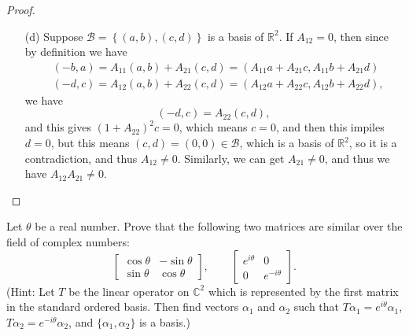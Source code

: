 \begin{proof}
\begin{itemize}
        \item [(d)] Suppose \(\mathcal{B} = \left\{ (a, b), (c, d) \right\} \) is a basis of \(\mathbb{R} ^2\). If \(A_{12} = 0\), then since by definition we have 
        \begin{align*}
            &(-b, a) = A_{11} (a, b) + A_{21} (c, d) = \left( A_{11} a + A_{21}c, A_{11}b + A_{21}d  \right)  \\
            &(-d, c) = A_{12} (a, b) + A_{22} (c, d) = \left( A_{12}a + A_{22}c, A_{12}b + A_{22}d     \right),
        \end{align*} we have 
        \[
            (-d, c) = A_{22} (c, d), 
        \] and this gives \((1 +A_{22} )^2 c = 0\), which means \(c = 0\), and then this impiles \(d = 0\), but this means \((c, d) = (0, 0) \in \mathcal{B} \), which is a basis of \(\mathbb{R} ^2\), so it is a contradiction, and thus \(A_{12} \neq 0\). Similarly, we can get \(A_{21} \neq 0 \), and thus we have \(A_{12} A_{21} \neq 0  \).        
    \end{itemize}
\end{proof}
\begin{problem}
    Let \(\theta\) be a real number.  Prove that the following two matrices are similar over the field of complex numbers:
    \[
    \begin{bmatrix}
        \cos\theta & -\sin\theta \\[4pt]
        \sin\theta & \cos\theta
    \end{bmatrix},
    \qquad
    \begin{bmatrix}
        e^{i\theta} & 0 \\[4pt]
        0 & e^{-i\theta}
    \end{bmatrix}.
    \]
    (Hint: Let \(T\) be the linear operator on \(\mathbb{C}^2\) which is represented by the first matrix in the standard ordered basis. Then find vectors \(\alpha_1\) and \(\alpha_2\) such that \(T\alpha_1=e^{i\theta}\alpha_1\), \(T\alpha_2=e^{-i\theta}\alpha_2\), and \(\{\alpha_1,\alpha_2\}\) is a basis.)
\end{problem}
